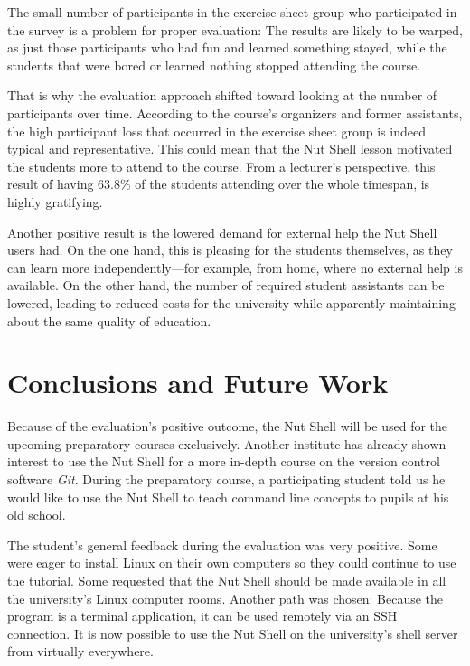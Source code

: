 \documentclass[paper=a4,abstract=on,cleardoublepage=empty,numbers=noenddot,toc=bib,12pt,appendixprefix=true]{scrreprt}
\begin{document}
The small number of participants in the exercise sheet group who participated in the survey is a problem for proper evaluation: The results are likely to be warped, as just those participants who had fun and learned something stayed, while the students that were bored or learned nothing stopped attending the course.

That is why the evaluation approach shifted toward looking at the number of participants over time. According to the course's organizers and former assistants, the high participant loss that occurred in the exercise sheet group is indeed typical and representative. This could mean that the Nut Shell lesson motivated the students more to attend to the course. From a lecturer's perspective, this result of having 63.8\% of the students attending over the whole timespan, is highly gratifying.

Another positive result is the lowered demand for external help the Nut Shell users had. On the one hand, this is pleasing for the students themselves, as they can learn more independently---for example, from home, where no external help is available. On the other hand, the number of required student assistants can be lowered, leading to reduced costs for the university while apparently maintaining about the same quality of education.

\chapter{Conclusions and Future Work}
\label{sec:conclusions}

Because of the evaluation's positive outcome, the Nut Shell will be used for the upcoming preparatory courses exclusively. Another institute has already shown interest to use the Nut Shell for a more in-depth course on the version control software \emph{Git}. During the preparatory course, a participating student told us he would like to use the Nut Shell to teach command line concepts to pupils at his old school.

The student's general feedback during the evaluation was very positive. Some were eager to install Linux on their own computers so they could continue to use the tutorial. Some requested that the Nut Shell should be made available in all the university's Linux computer rooms. Another path was chosen: Because the program is a terminal application, it can be used remotely via an SSH connection. It is now possible to use the Nut Shell on the university's shell server from virtually everywhere.
\end{document}
